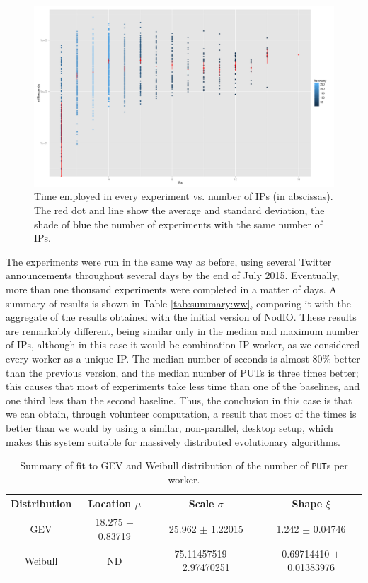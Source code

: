 \documentclass[journal,onecolumn]{IEEEtran}
\begin{document}
%
\begin{figure}[!htb]
\centering
\includegraphics[width=0.9\linewidth]{ips-time-ww.png}
\caption{Time employed in every experiment vs. number of IPs (in
  abscissas). The red dot and line show the average and standard
  deviation, the shade of blue the number of experiments with the same
  number of IPs. } 
\label{fig:ipstime:w2}
\end{figure}

The experiments were run in the same way as before, using several
Twitter announcements throughout several days by the end of July
2015. Eventually, more than one thousand experiments were completed in
a matter of days. A summary of results is shown in Table
\ref{tab:summary:ww}, comparing it with the aggregate of the results
obtained with the initial version of {\sf NodIO}. These results are
remarkably different, being similar only in the median and maximum
number of IPs, although in this case it would be combination
IP-worker, as we considered every worker as a unique IP. The median
number of seconds is almost 80\% better than the previous version, and
the median number of PUTs is three times better; this causes that most
of experiments take less time than one of the baselines, and one third
less than the second baseline. Thus, the conclusion in this case is
that we can obtain, through volunteer computation, a result that most of the times is better than we would by using a similar, non-parallel,
desktop setup, which makes this system suitable for massively
distributed evolutionary algorithms.
%
\begin{table}
\caption{Summary of fit to GEV and Weibull distribution of
  the number of {\tt PUT}s per worker. \label{tab:puts:ww}}
\begin{center}
\begin{tabular}{cccc}
\hline
Distribution & Location $\mu$ & Scale $\sigma$ & Shape $\xi$ \\
\hline
GEV & 18.275 $\pm$ 0.83719  &  25.962  $\pm$ 1.22015 & 1.242   $\pm$
0.04746 \\
Weibull & ND & 75.11457519 $\pm$ 2.97470251  & 0.69714410 $\pm$ 0.01383976 \\
\hline
\end{tabular}
\end{center}
\end{table}
%
\end{document}
